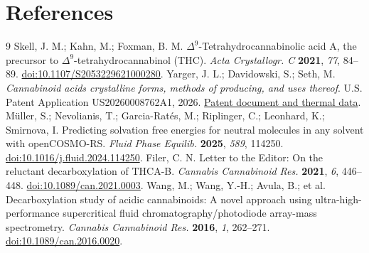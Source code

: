 \documentclass[10pt,a4paper,twocolumn]{article}
\begin{document}
\section*{References}\label{sec:references}
\begin{thebibliography}{9}\setlength{\itemsep}{3pt}\small
{}
Skell, J. M.; Kahn, M.; Foxman, B. M. $\Delta^9$-Tetrahydrocannabinolic acid A, the precursor to $\Delta^9$-tetrahydrocannabinol (THC). \emph{Acta Crystallogr. C} \textbf{2021}, \emph{77}, 84--89.
\href{https://doi.org/10.1107/S2053229621000280}{doi:10.1107/S2053229621000280}.
Yarger, J. L.; Davidowski, S.; Seth, M. \emph{Cannabinoid acids crystalline forms, methods of producing, and uses thereof}. U.S. Patent Application US20260008762A1, 2026.
\href{https://patents.google.com/patent/US20260008762A1/en}{Patent document and thermal data}.
Müller, S.; Nevolianis, T.; Garcia-Ratés, M.; Riplinger, C.; Leonhard, K.; Smirnova, I. Predicting solvation free energies for neutral molecules in any solvent with openCOSMO-RS. \emph{Fluid Phase Equilib.} \textbf{2025}, \emph{589}, 114250.
\href{https://doi.org/10.1016/j.fluid.2024.114250}{doi:10.1016/j.fluid.2024.114250}.
Filer, C. N. Letter to the Editor: On the reluctant decarboxylation of THCA-B. \emph{Cannabis Cannabinoid Res.} \textbf{2021}, \emph{6}, 446--448.
\href{https://doi.org/10.1089/can.2021.0003}{doi:10.1089/can.2021.0003}.
Wang, M.; Wang, Y.-H.; Avula, B.; et al. Decarboxylation study of acidic cannabinoids: A novel approach using ultra-high-performance supercritical fluid chromatography/photodiode array-mass spectrometry. \emph{Cannabis Cannabinoid Res.} \textbf{2016}, \emph{1}, 262--271.
\href{https://doi.org/10.1089/can.2016.0020}{doi:10.1089/can.2016.0020}.
\end{thebibliography}
\end{document}
